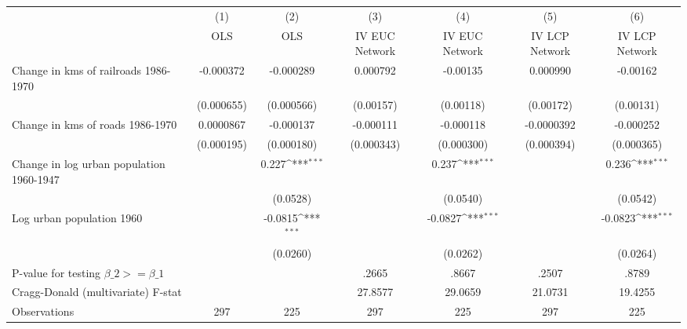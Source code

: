 {
\def\sym#1{\ifmmode^{#1}\else\(^{#1}\)\fi}
\begin{tabular}{l*{6}{c}}
\hline\hline
                &\multicolumn{1}{c}{(1)}&\multicolumn{1}{c}{(2)}&\multicolumn{1}{c}{(3)}&\multicolumn{1}{c}{(4)}&\multicolumn{1}{c}{(5)}&\multicolumn{1}{c}{(6)}\\
                &\multicolumn{1}{c}{OLS}&\multicolumn{1}{c}{OLS}&\multicolumn{1}{c}{IV EUC Network}&\multicolumn{1}{c}{IV EUC Network}&\multicolumn{1}{c}{IV LCP Network}&\multicolumn{1}{c}{IV LCP Network}\\
\hline
Change in kms of railroads 1986-1970&-0.000372         &-0.000289         & 0.000792         & -0.00135         & 0.000990         & -0.00162         \\
                &(0.000655)         &(0.000566)         &(0.00157)         &(0.00118)         &(0.00172)         &(0.00131)         \\
[1em]
Change in kms of roads 1986-1970&0.0000867         &-0.000137         &-0.000111         &-0.000118         &-0.0000392         &-0.000252         \\
                &(0.000195)         &(0.000180)         &(0.000343)         &(0.000300)         &(0.000394)         &(0.000365)         \\
[1em]
Change in log urban population 1960-1947&                  &    0.227\sym{***}&                  &    0.237\sym{***}&                  &    0.236\sym{***}\\
                &                  & (0.0528)         &                  & (0.0540)         &                  & (0.0542)         \\
[1em]
Log urban population 1960&                  &  -0.0815\sym{***}&                  &  -0.0827\sym{***}&                  &  -0.0823\sym{***}\\
                &                  & (0.0260)         &                  & (0.0262)         &                  & (0.0264)         \\
\hline
P-value for testing $\beta\_{2} >= \beta\_{1}$&                  &                  &    .2665         &    .8667         &    .2507         &    .8789         \\
Cragg-Donald (multivariate) F-stat&                  &                  &  27.8577         &  29.0659         &  21.0731         &  19.4255         \\
Observations    &      297         &      225         &      297         &      225         &      297         &      225         \\
\hline\hline
\end{tabular}
}
